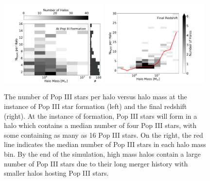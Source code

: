 \documentclass[fleqn,usenatbib]{mnras}
\begin{document}
\begin{figure}
  \centering
  \includegraphics[width=0.48\textwidth]{images/totnump3_halomass_sidehist.pdf}
  \hfill
  \includegraphics[width=0.48\textwidth]{images/final_redshift_Np3_mass.pdf}
  \caption{The number of Pop III stars per halo versus halo mass at the instance of Pop III star formation (left) and the final redshift (right). At the instance of formation, Pop III stars will form in a halo which contains a median number of four Pop III stars, with some containing as many as 16 Pop III stars. On the right, the red line indicates the median number of Pop III stars in each halo mass bin. By the end of the simulation, high mass halos contain a large number of Pop III stars due to their long merger history with smaller halos hosting Pop III stars.}
  \label{fig:num_p3}
\end{figure}
\end{document}

